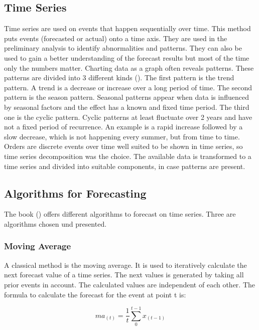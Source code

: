 \subsection{Time Series}\label{subsection:Time Series}
Time series are used on events that happen sequentially over time. This method puts events (forecasted or actual) onto a time axis.
They are used in the preliminary analysis to identify abnormalities and patterns. They can also be used to gain a better understanding of the forecast results but most of the time only the numbers matter. Charting data as a graph often reveals patterns. These patterns are divided into 3 different kinds (\cite{Hyndman.2013}). The first pattern is the trend pattern. A trend is a decrease or increase over a long period of time. The second pattern is the season pattern. Seasonal patterns appear when data is influenced by seasonal factors and the effect has a known and fixed time period. The third one is the cyclic pattern. Cyclic patterns at least fluctuate over 2 years and have not a fixed period of recurrence. An example is a rapid increase followed by a slow decrease, which is not happening every summer, but from time to time.\newline
Orders are discrete events over time well suited to be shown in time series, so time series decomposition was the choice. The available data is transformed to a time series and divided into suitable components, in case patterns are present.
\subsection{Algorithms for Forecasting}\label{subsection:Algorithms for Forecasting}
The book (\cite{Hyndman.2013}) offers different algorithms to forecast on time series. Three are algorithms chosen und presented.
\subsubsection{Moving Average}\label{subsubsection:Moving Average}
A classical method is the moving average. It is used to iteratively calculate the next forecast value of a time series. The next values is generated by taking all prior events in account. The calculated values are independent of each other.\newline
The formula to calculate the forecast for the event at point t is:
\begin{center}
\begin{equation}
ma_{(t)}= \frac{1}{t}\sum^{t-1}_0 x_{(t-1)}
\end{equation}
\end{center}

